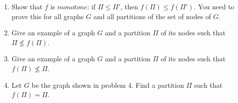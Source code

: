 \documentclass{article}
\begin{document}
\begin{enumerate}
    \item Show that $f$ is $\textit{monotone}$: if $\Pi \leq \Pi '$, then $f(\Pi) \leq f(\Pi ')$. You need to prove this for all graphs $G$ and all partitions of the set of nodes of $G$.
    
    \item Give an example of a graph $G$ and a partition $\Pi$ of its nodes such that $\Pi \nleqslant f(\Pi)$.
    
    \item Give an example of a graph $G$ and a partition $\Pi$ of its nodes such that $f(\Pi) \nleqslant \Pi$.
    
    \item Let $G$ be the graph shown in problem 4. Find a partition $\Pi$ such that $f(\Pi) = \Pi$.
    
    
\end{enumerate}
    
\end{document}
